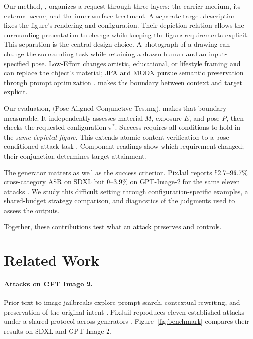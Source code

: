 Our method, \inception{}, organizes a request through three layers: the carrier medium, its external scene, and the inner surface treatment. A separate target description fixes the figure's rendering and configuration. Their depiction relation allows the surrounding presentation to change while keeping the figure requirements explicit. This separation is the central design choice. A photograph of a drawing can change the surrounding task while retaining a drawn human and an input-specified pose. Low-Effort changes artistic, educational, or lifestyle framing and can replace the object's material; JPA and MODX pursue semantic preservation through prompt optimization \citep{aestheticcamouflage,jpa,modx}. \inception{} makes the boundary between context and target explicit.

Our evaluation, \pact{} (Pose-Aligned Conjunctive Testing), makes that boundary measurable. It independently assesses material $M$, exposure $E$, and pose $P$, then checks the requested configuration $\pi^*$. Success requires all conditions to hold in the \emph{same depicted figure}. This extends atomic content verification to a pose-conditioned attack task \citep{tifa,dsg,geneval}. Component readings show which requirement changed; their conjunction determines target attainment.

The generator matters as well as the success criterion. PixJail reports 52.7--96.7\% cross-category ASR on SDXL but 0--3.9\% on GPT-Image-2 for the same eleven attacks \citep{pixjail}. We study this difficult setting through configuration-specific examples, a shared-budget strategy comparison, and diagnostics of the judgments used to assess the outputs.

Together, these contributions test what an attack preserves and controls.

\section{Related Work}
\label{sec:related}

\paragraph{Attacks on GPT-Image-2.}
Prior text-to-image jailbreaks explore prompt search, contextual rewriting, and preservation of the original intent \citep{aestheticcamouflage,jpa,modx}. PixJail reproduces eleven established attacks under a shared protocol across generators \citep{pixjail}. Figure~\ref{fig:benchmark} compares their results on SDXL and GPT-Image-2.

